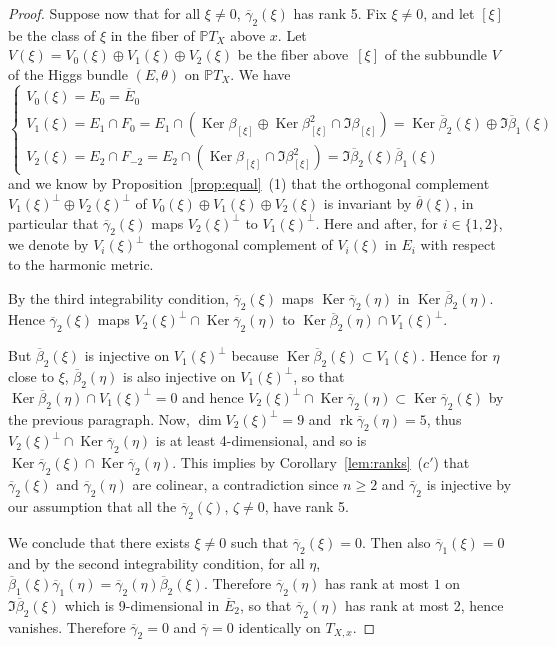 \documentclass[10pt]{amsart}
\theoremstyle{plain}
\theoremstyle{definition}
\let\ov\overline
\DeclareMathOperator{\Ker}{Ker}
\DeclareMathOperator{\rk}{rk}
\newcommand{\PTX}{{\mathbb{P}T_X}}
\newcommand{\ovE}{\ov{E}}
\newcommand{\ovb}{\ov{\beta}}
\newcommand{\ovg}{\ov{\gamma}}
\newcommand{\ovt}{\ov{\theta}}
\begin{document}
\begin{proof}
Suppose now that for all $\xi\neq 0$, $\ovg_2(\xi)$ has rank 5. Fix $\xi\neq 0$, and let
$[\xi]$ be the class of $\xi$ in the fiber of $\PTX$ above $x$. Let $V(\xi)=V_0(\xi)\oplus
V_1(\xi)\oplus V_2(\xi)$ be the fiber above~$[\xi]$ of the subbundle $V$ of the Higgs bundle
$(E,\theta)$ on $\PTX$. We have
$$
\begin{cases}
V_0(\xi)=E_0=\ovE_0 \\
V_1(\xi)=E_1\cap F_0=E_1\cap(\Ker\beta_{[\xi]}\oplus\Ker\beta_{[\xi]}^2\cap\Im\beta_{[\xi]})=\Ker\ovb_2(\xi)\oplus\Im\ovb_1(\xi)\\
V_2(\xi)=E_2\cap F_{-2}= E_2\cap(\Ker\beta_{[\xi]}\cap\Im\beta^2_{[\xi]})=\Im\ovb_2(\xi)\ovb_1(\xi)
\end{cases}
$$
and we know by Proposition~\ref{prop:equal}~(1) that the orthogonal complement $V_1(\xi)^\perp\oplus
V_2(\xi)^\perp$ of $V_0(\xi)\oplus V_1(\xi)\oplus V_2(\xi)$ is invariant by $\ovt(\xi)$, in particular that
$\ovg_2(\xi)$ maps $V_2(\xi)^\perp$ to $V_1(\xi)^\perp$. Here and after, for $i\in\{1,2\}$, we
denote by $V_i(\xi)^\perp$ the
orthogonal complement of $V_i(\xi)$ in $E_i$ with respect to the harmonic metric.

By the third integrability condition, $\ovg_2(\xi)$ maps
$\Ker\ovg_2(\eta)$ in $\Ker\ovb_2(\eta)$. Hence $\ovg_2(\xi)$ maps
$V_2(\xi)^\perp\cap\Ker\ovg_2(\eta)$ to
$\Ker\ovb_2(\eta)\cap V_1(\xi)^\perp$.

But $\ovb_2(\xi)$ is injective on $V_1(\xi)^\perp$ because $\Ker\ovb_2(\xi)\subset
V_1(\xi)$. Hence for $\eta$ close to $\xi$, $\ovb_2(\eta)$ is also injective on $V_1(\xi)^\perp$, so that
$\Ker\ovb_2(\eta)\cap V_1(\xi)^\perp=0$ and hence
$V_2(\xi)^\perp\cap\Ker\ovg_2(\eta)\subset\Ker\ovg_2(\xi)$ by the previous paragraph. Now, \hbox{$\dim
V_2(\xi)^\perp=9$} and
$\rk\ovg_2(\eta)=5$, thus $V_2(\xi)^\perp\cap\Ker\ovg_2(\eta)$ is at least 4-dimensional, and so is \hbox{$\Ker\ovg_2(\xi)\cap\Ker\ovg_2(\eta)$}. This implies
by Corollary~\ref{lem:ranks}~($c'$) that $\ovg_2(\xi)$ and
$\ovg_2(\eta)$ are colinear, a contradiction since $n\geq 2$ and $\bar\gamma_2$ is injective by our
assumption that all the $\ovg_2(\zeta)$, $\zeta\neq 0$, have rank 5.

We conclude that there exists $\xi\neq 0$ such that $\ovg_2(\xi)=0$. Then also $\ovg_1(\xi)=0$ and by
the second integrability condition, for all $\eta$, $\ovb_1(\xi)\ovg_1(\eta) =
\ovg_2(\eta)\ovb_2(\xi)$. Therefore
$\ovg_2(\eta)$ has rank at most $1$ on $\Im\ovb_2(\xi)$ which is 9-dimensional in $\ovE_2$, so that
$\ovg_2(\eta)$ has
rank at most 2, hence vanishes. Therefore $\ovg_2=0$ and $\ovg=0$ identically on $T_{X,x}$.
\end{proof}
\end{document}
